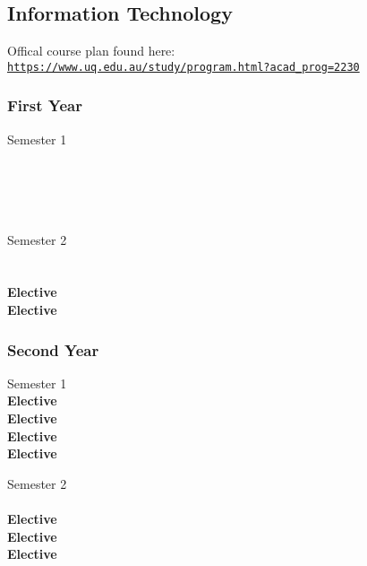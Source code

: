 \subsection{Information Technology}

Offical course plan found here: \\
\href{https://www.uq.edu.au/study/program.html?acad_prog=2230}{\nolinkurl{https://www.uq.edu.au/study/program.html?acad_prog=2230}}

\subsubsection{First Year}
\begin{center}
\begin{multicols}{2}
Semester 1 \\
 \\
 \\
 \\
 \\
\vfill
\columnbreak

Semester 2 \\
 \\
 \\
\textbf{Elective} \\
\textbf{Elective} \\
\end{multicols}
\end{center}

\subsubsection{Second Year}
\begin{center}
\begin{multicols}{2}
Semester 1 \\
\textbf{Elective} \\
\textbf{Elective} \\
\textbf{Elective} \\
\textbf{Elective} \\
\vfill
\columnbreak

Semester 2 \\
 \\
\textbf{Elective} \\
\textbf{Elective} \\
\textbf{Elective} \\
\end{multicols}
\end{center}

